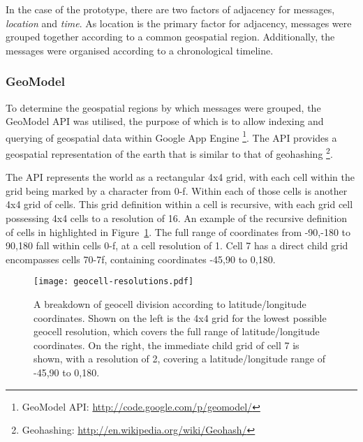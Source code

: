 \documentclass{article}
\begin{document}
In the case of the prototype, there are two factors of adjacency for messages, \emph{location} and \emph{time}. As location is the primary factor for adjacency, messages were grouped together according to a common geospatial region. Additionally, the messages were organised according to a chronological timeline.


\subsubsection{GeoModel} %

To determine the geospatial regions by which messages were grouped, the GeoModel API was utilised, the purpose of which is to allow indexing and querying of geospatial data within Google App Engine \footnote{GeoModel API: \url{http://code.google.com/p/geomodel/}}. The API provides a geospatial representation of the earth that is similar to that of geohashing \footnote{Geohashing: \url{http://en.wikipedia.org/wiki/Geohash/}}.

The API represents the world as a rectangular 4x4 grid, with each cell within the grid being marked by a character from 0-f. Within each of those cells is another 4x4 grid of cells. This grid definition within a cell is recursive, with each grid cell possessing 4x4 cells to a resolution of 16. An example of the recursive definition of cells in highlighted in Figure~\ref{fig:geocell_resolutions}. The full range of coordinates from -90,-180 to 90,180 fall within cells 0-f, at a cell resolution of 1. Cell 7 has a direct child grid encompasses cells 70-7f, containing coordinates -45,90 to 0,180.

\begin{figure}
\begin{center}
\texttt{[image: geocell-resolutions.pdf]}
\caption{A breakdown of geocell division according to latitude/longitude coordinates. Shown on the left is the 4x4 grid for the lowest possible geocell resolution, which covers the full range of latitude/longitude coordinates. On the right, the immediate child grid of cell 7 is shown, with a resolution of 2, covering a latitude/longitude range of -45,90 to 0,180.}
\label{fig:geocell_resolutions}
\end{center}
\end{figure}

\end{document}
